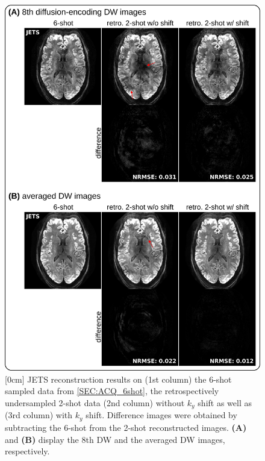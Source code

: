 \documentclass[preprint,12pt,authoryear,review]{elsarticle}
\begin{document}

    \begin{figure}
        \centering
        \includegraphics[width=0.85\linewidth]{../figures/fig2.png}
        \caption{\protect{}[0cm]
            JETS reconstruction results on
            (1st column) the 6-shot sampled data from \cref{SEC:ACQ_6shot},
            the retrospectively undersampled 2-shot data
            (2nd column) without $k_y$ shift as well as
            (3rd column) with $k_y$ shift.
            Difference images were obtained by
            subtracting the 6-shot from
            the 2-shot reconstructed images.
            \textbf{(A)} and \textbf{(B)} display
            the 8th DW and the averaged DW images,
            respectively.}
        \label{FIG:gt_6shot}
    \end{figure}
\end{document}
